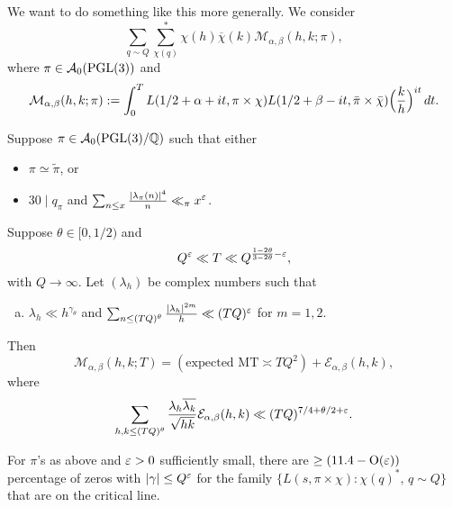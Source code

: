 \documentclass[reqno]{amsart} 
\begin{document}
We want to do something like this more generally.  We consider
\begin{equation*}
  \sum_{q \sim Q} \sum_{\chi(q)}^\ast
  \chi(h) \overline{\chi}(k)
  \mathcal{M}_{\alpha, \beta}(h, k; \pi),
\end{equation*}
where $\pi \in \mathcal{A}_0(\operatorname{PGL} (3))$  and
\begin{equation}\label{eq:cq6w5d17ud}
  \mathcal{M}_{\alpha, \beta}(h, k;\pi) := \int_0^T L(1/2 + \alpha + i t, \pi \times \chi)
  L(1/2 + \beta - i t, \bar{\pi} \times \bar{\chi})
  \Bigl( \frac{k}{h} \Bigr)^{i t} \, d t.
\end{equation}
\begin{theorem}
  Suppose $\pi \in \mathcal{A}_0(\operatorname{PGL}(3) / \mathbb{Q})$ such that either
  \begin{itemize}
  \item $\pi \simeq \tilde{\pi}$, or
  \item $30 \mid q_\pi$ and  $\sum_{n \leq x} \frac{\lvert \lambda_\pi(n) \rvert^4}{n} \ll_\pi x^\varepsilon$.
  \end{itemize}
  Suppose $\theta \in [0,1/2)$ and
  \begin{equation}\label{eq:cq6w5d7akn}
    Q^\varepsilon \ll T \ll Q^{\frac{1 - 2 \theta}{3 - 2 \theta} - \varepsilon},
  \end{equation}
  with $Q \rightarrow \infty$.  Let $(\lambda_h)$ be complex numbers such that
  \begin{enumerate}[(a)]
  \item\label{enumerate:cq6w5d4pra} $\lambda_h \ll h^{\gamma_\theta}$ and $\sum_{n \leq(T Q)^\theta} \frac{\lvert \lambda_h \rvert^{2 m}}{h} \ll(T Q)^\varepsilon$ for $m = 1, 2$.
  \end{enumerate}
  Then
  \begin{equation*}
    \mathcal{M}_{\alpha, \beta}(h, k; T) =(\text{expected } \mathrm{MT} \asymp T Q^2)
    + \mathcal{E}_{\alpha, \beta}(h, k),
  \end{equation*}
  where
  \begin{equation*}
    \sum_{h, k \leq(T Q)^\theta}
    \frac{\lambda_h \overline{\lambda_k}}{\sqrt{h k}}
    \mathcal{E}_{\alpha, \beta}(h, k)
    \ll(T Q)^{7/4 + \theta / 2 + \varepsilon}.
  \end{equation*}
\end{theorem}
\begin{theorem}
  For $\pi$'s as above and $\varepsilon > 0$ sufficiently small, there are $\geq(11.4 - \operatorname{O}(\varepsilon))$ percentage of zeros with $\lvert \gamma \rvert \leq Q^\varepsilon$ for the family $\{L(s, \pi \times \chi) : \chi(q)^\ast, \, q \sim Q\}$ that are on the critical line.
\end{theorem}
\end{document}
